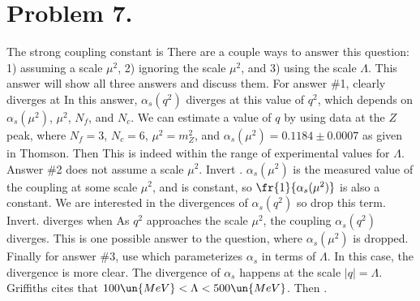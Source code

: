 \documentclass{article}
\begin{document}
\section*{Problem 7.}
The strong coupling constant is
There are a couple ways to answer this question: 1) assuming a scale $\mu^2$, 2) ignoring the scale $\mu^2$, and 3) using the scale $\Lambda$. This answer will show all three answers and discuss them. For answer \#1,  clearly diverges at
In this answer, $\alpha_s(q^2)$ diverges at this value of $q^2$, which depends on $\alpha_s(\mu^2)$, $\mu^2$, $N_f$, and $N_c$. We can estimate a value of $q$ by using data at the $Z$ peak, where $N_f=3$, $N_c=6$, $\mu^2=m_Z^2$, and $\alpha_s(\mu^2)=0.1184\pm 0.0007$ as given in Thomson. Then
This is indeed within the range of experimental values for $\Lambda$. Answer \#2 does not assume a scale $\mu^2$. Invert .
$\alpha_s(\mu^2)$ is the measured value of the coupling at some scale $\mu^2$, and is constant, so $\fr{1}{\alpha_s(\mu^2)}$ is also a constant. We are interested in the divergences of $\alpha_s(q^2)$ so drop this term.
Invert.
 diverges when
As $q^2$ approaches the scale $\mu^2$, the coupling $\alpha_s(q^2)$ diverges. This is one possible answer to the question, where $\alpha_s(\mu^2)$ is dropped. Finally for answer \#3, use  which parameterizes $\alpha_s$ in terms of $\Lambda$. 
In this case, the divergence is more clear.
The divergence of $\alpha_s$ happens at the scale $|q|=\Lambda$. Griffiths cites that $100\un{MeV}< \Lambda <500\un{MeV}$. Then .
\end{document}
